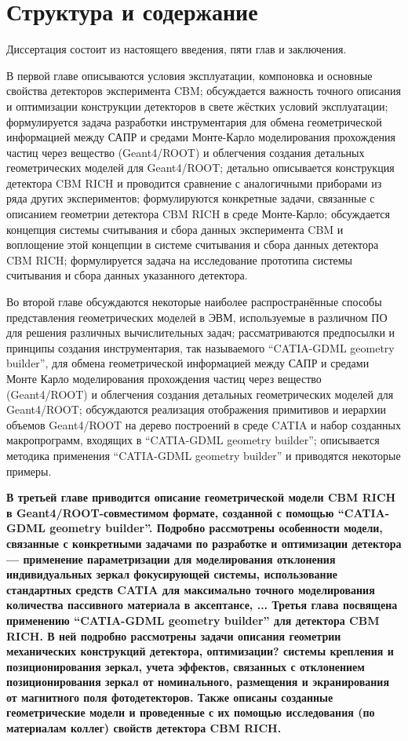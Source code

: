 \section{Структура и содержание}\label{sec:secStructureAndContent}

Диссертация состоит из настоящего введения, пяти глав и заключения.

В первой главе
описываются условия эксплуатации, компоновка и основные свойства детекторов эксперимента CBM;
обсуждается важность точного описания и оптимизации конструкции детекторов в свете жёстких условий эксплуатации;
формулируется задача разработки инструментария для обмена геометрической информацией между САПР и средами Монте-Карло моделирования прохождения частиц через вещество (Geant4/ROOT) и облегчения создания детальных геометрических моделей для Geant4/ROOT;
детально описывается конструкция детектора CBM RICH и проводится сравнение с аналогичными приборами из ряда других экспериментов;
формулируются конкретные задачи, связанные с описанием геометрии детектора CBM RICH в среде Монте-Карло;
обсуждается концепция системы считывания и сбора данных эксперимента CBM и воплощение этой концепции в системе считывания и сбора данных детектора CBM RICH;
формулируется задача на исследование прототипа системы считывания и сбора данных указанного детектора.

Во второй главе
обсуждаются некоторые наиболее распространённые способы представления геометрических моделей в ЭВМ, используемые в различном ПО для решения различных вычислительных задач;
рассматриваются предпосылки и принципы создания инструментария, так называемого ``CATIA-GDML geometry builder'', для обмена геометрической информацией между САПР и средами Монте Карло моделирования прохождения частиц через вещество (Geant4/ROOT) и облегчения создания детальных геометрических моделей для Geant4/ROOT;
обсуждаются реализация отображения примитивов и иерархии объемов Geant4/ROOT на дерево построений в среде CATIA и набор созданных макропрограмм, входящих в ``CATIA-GDML geometry builder'';
описывается методика применения ``CATIA-GDML geometry builder'' и приводятся некоторые примеры.

\textbf{В третьей главе
приводится описание геометрической модели CBM RICH в Geant4/ROOT-совместимом формате, созданной с помощью ``CATIA-GDML geometry builder''. Подробно рассмотрены особенности модели, связанные с конкретными задачами по разработке и оптимизации детектора --- применение параметризации для моделирования отклонения индивидуальных зеркал фокусирующей системы, использование стандартных средств CATIA для максимально точного моделирования количества пассивного материала в аксептансе, ...
Третья глава посвящена применению ``CATIA-GDML geometry builder'' для детектора CBM RICH. В ней подробно рассмотрены задачи описания геометрии механических конструкций детектора, оптимизации? системы крепления и позиционирования зеркал, учета эффектов, связанных с отклонением позиционирования зеркал от номинального, размещения и экранирования от магнитного поля фотодетекторов. Также описаны созданные геометрические модели и проведенные с их помощью исследования (по материалам коллег) свойств детектора CBM RICH.
}


